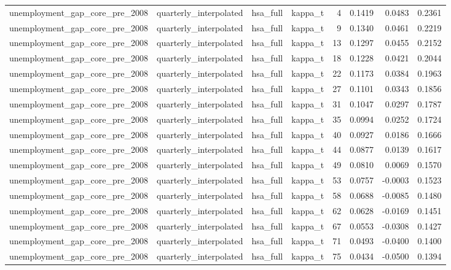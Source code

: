\begin{tabular}{llllrrrr}
unemployment\_gap\_core\_pre\_2008 & quarterly\_interpolated & hsa\_full & kappa\_t & 4 & 0.1419 & 0.0483 & 0.2361 \\
unemployment\_gap\_core\_pre\_2008 & quarterly\_interpolated & hsa\_full & kappa\_t & 9 & 0.1340 & 0.0461 & 0.2219 \\
unemployment\_gap\_core\_pre\_2008 & quarterly\_interpolated & hsa\_full & kappa\_t & 13 & 0.1297 & 0.0455 & 0.2152 \\
unemployment\_gap\_core\_pre\_2008 & quarterly\_interpolated & hsa\_full & kappa\_t & 18 & 0.1228 & 0.0421 & 0.2044 \\
unemployment\_gap\_core\_pre\_2008 & quarterly\_interpolated & hsa\_full & kappa\_t & 22 & 0.1173 & 0.0384 & 0.1963 \\
unemployment\_gap\_core\_pre\_2008 & quarterly\_interpolated & hsa\_full & kappa\_t & 27 & 0.1101 & 0.0343 & 0.1856 \\
unemployment\_gap\_core\_pre\_2008 & quarterly\_interpolated & hsa\_full & kappa\_t & 31 & 0.1047 & 0.0297 & 0.1787 \\
unemployment\_gap\_core\_pre\_2008 & quarterly\_interpolated & hsa\_full & kappa\_t & 35 & 0.0994 & 0.0252 & 0.1724 \\
unemployment\_gap\_core\_pre\_2008 & quarterly\_interpolated & hsa\_full & kappa\_t & 40 & 0.0927 & 0.0186 & 0.1666 \\
unemployment\_gap\_core\_pre\_2008 & quarterly\_interpolated & hsa\_full & kappa\_t & 44 & 0.0877 & 0.0139 & 0.1617 \\
unemployment\_gap\_core\_pre\_2008 & quarterly\_interpolated & hsa\_full & kappa\_t & 49 & 0.0810 & 0.0069 & 0.1570 \\
unemployment\_gap\_core\_pre\_2008 & quarterly\_interpolated & hsa\_full & kappa\_t & 53 & 0.0757 & -0.0003 & 0.1523 \\
unemployment\_gap\_core\_pre\_2008 & quarterly\_interpolated & hsa\_full & kappa\_t & 58 & 0.0688 & -0.0085 & 0.1480 \\
unemployment\_gap\_core\_pre\_2008 & quarterly\_interpolated & hsa\_full & kappa\_t & 62 & 0.0628 & -0.0169 & 0.1451 \\
unemployment\_gap\_core\_pre\_2008 & quarterly\_interpolated & hsa\_full & kappa\_t & 67 & 0.0553 & -0.0308 & 0.1427 \\
unemployment\_gap\_core\_pre\_2008 & quarterly\_interpolated & hsa\_full & kappa\_t & 71 & 0.0493 & -0.0400 & 0.1400 \\
unemployment\_gap\_core\_pre\_2008 & quarterly\_interpolated & hsa\_full & kappa\_t & 75 & 0.0434 & -0.0500 & 0.1394 \\

\end{tabular}
